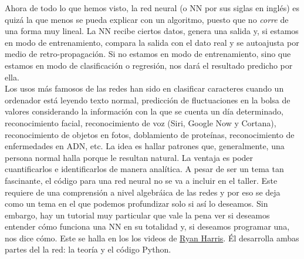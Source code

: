 \documentclass[10pt,letterpaper]{article}
\begin{document}
Ahora de todo lo que hemos visto, la red neural (o NN por sus siglas en ingl\'es) es quiz\'a la que menos se pueda explicar con un algoritmo, puesto que no \emph{corre} de una forma muy lineal. La NN recibe ciertos datos, genera una salida y, si estamos en modo de entrenamiento, compara la salida con el dato real y se autoajusta por medio de retro-propagaci\'on. Si no estamos en modo de entrenamiento, sino que estamos en modo de clasificaci\'on o regresi\'on, nos dar\'a el resultado predicho por ella.\\

Los usos m\'as famosos de las redes han sido en clasificar caracteres cuando un ordenador est\'a leyendo texto normal, predicci\'on de fluctuaciones en la bolsa de valores considerando la informaci\'on con la que se cuenta un d\'ia determinado, reconocimiento facial, reconocimiento de voz (Siri, Google Now y Cortana), reconocimiento de objetos en fotos, doblamiento de prote\'inas, reconocimiento de enfermedades en ADN, etc. La idea es hallar patrones que, generalmente, una persona normal halla porque le resultan natural. La ventaja es poder cuantificarlos e identificarlos de manera anal\'itica. A pesar de ser un tema tan fascinante, el c\'odigo para una red neural no se va a incluir en el taller. Este requiere de una comprensi\'on a nivel algebr\'aica de las redes y por eso se deja como un tema en el que podemos profundizar solo si as\'i lo deseamos. Sin embargo, hay un tutorial muy particular que vale la pena ver si deseamos entender c\'omo funciona una NN en su totalidad y, si deseamos programar una, nos dice c\'omo. Este se halla en los los videos de \href{https://www.youtube.com/channel/UCRAmB5K-2GLvtaXcH9GCy-A}{Ryan Harris}. \'El desarrolla ambas partes del la red: la teor\'ia y el c\'odigo Python.
\end{document}
